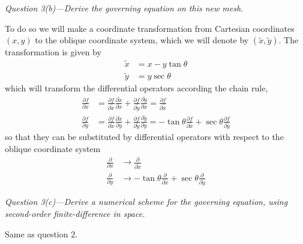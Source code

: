 \documentclass[11pt]{article}
\begin{document}
\begin{tcolorbox}
  \textit{Question 3(b)---Derive the governing equation on this new mesh.}
\end{tcolorbox}
To do so we will make a coordinate transformation from Cartesian coordinates $(x,y)$ to the oblique coordinate system, which we will denote by $(\tilde{x}, \tilde{y})$. The transformation is given by
\begin{subequations}
\begin{align}
  \tilde{x} &= x - y\tan\theta \\
  \tilde{y} &= y\sec\theta
\end{align}
\end{subequations}
which will transform the differential operators according the chain rule,
\begin{align*}
  \frac{\partial f}{\partial x} &= \frac{\partial f}{\partial \tilde{x}} \frac{\partial \tilde{x}}{\partial x}
  + \frac{\partial f}{\partial \tilde{y}} \frac{\partial \tilde{y}}{\partial x} = \frac{\partial f}{\partial \tilde{x}} \\
  \frac{\partial f}{\partial y} &= \frac{\partial f}{\partial \tilde{x}} \frac{\partial \tilde{x}}{\partial y}
  + \frac{\partial f}{\partial \tilde{y}} \frac{\partial \tilde{y}}{\partial y} = -\tan\theta\frac{\partial f}{\partial \tilde{x}} + \sec\theta \frac{\partial f}{\partial \tilde{y}}
\end{align*}
so that they can be substituted by differential operators with respect to the oblique coordinate system
\begin{subequations}
\begin{align}
  \frac{\partial}{\partial x} &\rightarrow \frac{\partial}{\partial \tilde{x}} \\
  \frac{\partial}{\partial y} &\rightarrow -\tan\theta\frac{\partial}{\partial \tilde{x}} + \sec\theta\frac{\partial}{\partial \tilde{y}}
\end{align}
\end{subequations}

\begin{tcolorbox}
  \textit{Question 3(c)---Derive a numerical scheme for the governing equation, using second-order finite-difference in space.}
\end{tcolorbox}

Same as question 2.
\end{document}
